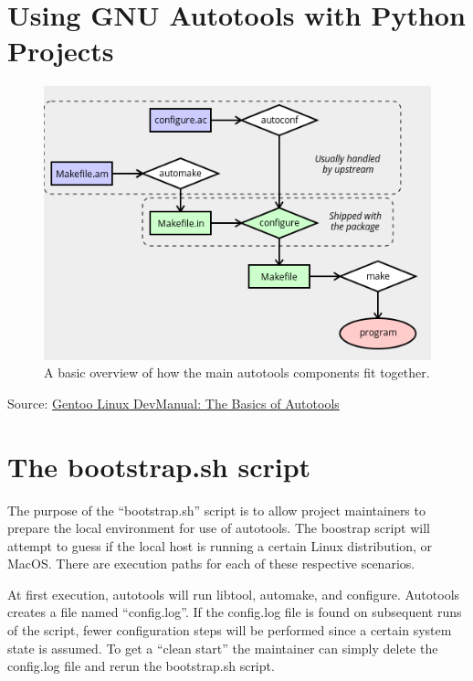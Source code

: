 






\section{\label{sec:Start}Using GNU Autotools with Python Projects}
\vspace{2mm}
\justifying


\begin{figure}[ht]
    \includegraphics[width=12cm]{images/diagram.png}
    \caption{A basic overview of how the main autotools components fit together.}
    \label{diagram}
\end{figure}

Source: \href{https://devmanual.gentoo.org/general-concepts/autotools/index.html}{Gentoo Linux DevManual: The Basics of Autotools}

\section{\label{sec:bootstrap}The bootstrap.sh script}

The purpose of the ``bootstrap.sh'' script is to allow project maintainers to prepare the local environment for use of autotools.
The boostrap script will attempt to guess if the local host is running a certain Linux distribution, or MacOS. There are execution
paths for each of these respective scenarios.

At first execution, autotools will run libtool, automake, and configure. Autotools creates a file named ``config.log''. If the config.log
file is found on subsequent runs of the script, fewer configuration steps will be performed since a certain system state is assumed. To
get a ``clean start'' the maintainer can simply delete the config.log file and rerun the bootstrap.sh script.


